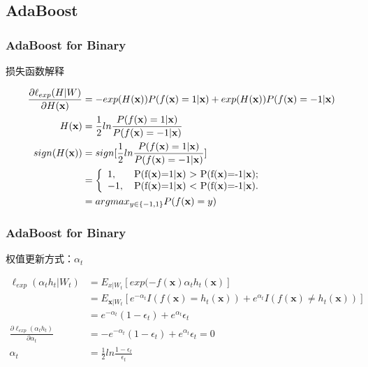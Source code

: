 \documentclass[usenames,dvipsnames]{beamer}
\begin{document}
\subsection{AdaBoost}
\begin{frame}
\frametitle{AdaBoost for Binary} 
\begin{block}{损失函数解释}
\end{block}
\begin{align*}
    \frac{\partial \ell_{exp}(H|W)}{\partial H(\textbf{x})} 
                    & = -exp(H(\textbf{x}))P(f(\textbf{x})
                      = 1|\textbf{x})+exp(H(\textbf{x}))P(f(\textbf{x})=-1|\textbf{x})\\
      H(\textbf{x}) & = \frac{1}{2}ln\frac{P(f(\textbf{x})=1|\textbf{x})}{P(f(\textbf{x})=-1|\textbf{x})}\\
sign(H(\textbf{x})) & = sign[\frac{1}{2}ln\frac{P(f(\textbf{x})=1|\textbf{x})}{P(f(\textbf{x})=-1|\textbf{x})}]\\
                    & = \left \{\begin{array}{ll}
                              1,\, &$P(f(\textbf{x})=1|\textbf{x}) > P(f(\textbf{x})=-1|\textbf{x})$;\\
                             -1,\, &$P(f(\textbf{x})=1|\textbf{x}) < P(f(\textbf{x})=-1|\textbf{x})$.
                                \end{array} \right.\\
                    & = arg max_{y\in \{-1,1\}} P(f(\textbf{x})=y)
\end{align*}
\end{frame}
\begin{frame}
\frametitle{AdaBoost for Binary} 
\begin{block}{权值更新方式：$\alpha_t$}
\end{block}
\begin{align*}
  \ell_{exp}(\alpha_t h_t|W_t) & = E_{x|W_t}[exp(-f(\textbf{x})\alpha_th_t(\textbf{x})] \\
             & = E_{\textbf{x}|W_t}[e^{-\alpha_t}I(f(\textbf{x})=h_t(\textbf{x}))+e^{\alpha_t}I(f(\textbf{x})\neq h_t(\textbf{x}))] \\
             & = e^{-\alpha_t}(1-\epsilon_t) + e^{\alpha_t}\epsilon_t\\
  \frac{\partial \ell_{exp}(\alpha_th_t)}{\partial \alpha_t} & = -e^{-\alpha_t}(1-\epsilon_t) + e^{\alpha_t}\epsilon_t = 0 \\
        \alpha_t & = \frac{1}{2}ln\frac{1-\epsilon_t}{\epsilon_t}
\end{align*}
\end{frame}
\end{document}
